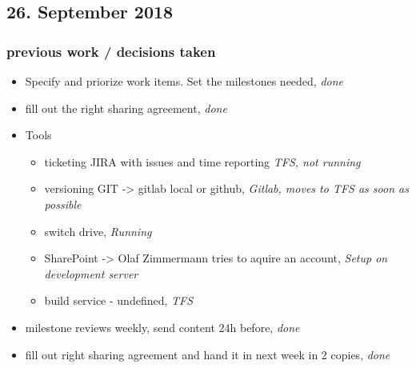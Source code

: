 \documentclass{article}
\begin{document}
        
    
\subsection{26. September 2018}

\subsubsection{previous work / decisions taken}
\begin{itemize}
    \item Specify and priorize work items. Set the milestones needed, \textit{done}
    \item fill out the right sharing agreement, \textit{done}
    \item Tools
        \begin{itemize}
            \item ticketing JIRA with issues and time reporting \textit{TFS, not running}
            \item versioning GIT -> gitlab local or github, \textit{Gitlab, moves to TFS as soon as possible}
            \item switch drive, \textit{Running}
            \item SharePoint -> Olaf Zimmermann tries to aquire an account, \textit{Setup on development server}
            \item build service - undefined, \textit{TFS}
        \end{itemize}
        \item milestone reviews weekly, send content 24h before, \textit{done}
        \item fill out right sharing agreement and hand it in next week in 2 copies, \textit{done}
\end{itemize}
\end{document}
